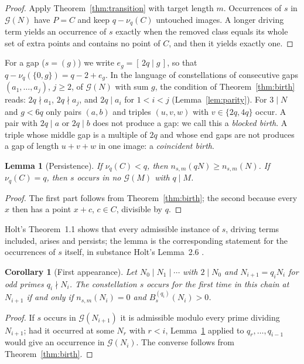 \documentclass[11pt]{article}
\newtheorem{lemma}[theorem]{Lemma}
\newtheorem{corollary}[theorem]{Corollary}
\theoremstyle{definition}
\theoremstyle{remark}
\newcommand{\G}{\mathcal{G}}
\begin{document}
\begin{proof}
Apply Theorem~\ref{thm:transition} with target length $m$. Occurrences of $s$ in $\G(N)$ have $P = C$ and keep $q - \nu_q(C)$ untouched images. A longer driving term yields an occurrence of $s$ exactly when the removed class equals its whole set of extra points and contains no point of $C$, and then it yields exactly one.
\end{proof}

For a gap ($s = (g)$) we write $e_g = [\,2q \mid g\,]$, so that $q - \nu_q(\{0, g\}) = q - 2 + e_g$. In the language of constellations of consecutive gaps $(a_1, \dots, a_j)$, $j \ge 2$, of $\G(N)$ with sum $g$, the condition of Theorem~\ref{thm:birth} reads: $2q \nmid a_1$, $2q \nmid a_j$, and $2q \mid a_i$ for $1 < i < j$ (Lemma~\ref{lem:parity}). For $3 \mid N$ and $g < 6q$ only pairs $(a, b)$ and triples $(u, v, w)$ with $v \in \{2q, 4q\}$ occur. A pair with $2q \mid a$ or $2q \mid b$ does not produce a gap: we call this a \emph{blocked birth}. A triple whose middle gap is a multiple of $2q$ and whose end gaps are not produces a gap of length $u + v + w$ in one image: a \emph{coincident birth}.

\begin{lemma}[Persistence]\label{lem:persistence}
If $\nu_q(C) < q$, then $n_{s,m}(qN) \ge n_{s,m}(N)$. If $\nu_q(C) = q$, then $s$ occurs in no $\G(M)$ with $q \mid M$.
\end{lemma}

\begin{proof}
The first part follows from Theorem~\ref{thm:birth}; the second because every $x$ then has a point $x + c$, $c \in C$, divisible by $q$.
\end{proof}

Holt's Theorem~1.1 \cite{Ho25} shows that every admissible instance of $s$, driving terms included, arises and persists; the lemma is the corresponding statement for the occurrences of $s$ itself, in substance Holt's Lemma~2.6 \cite{Ho26}.

\begin{corollary}[First appearance]\label{cor:first}
Let $N_0 \mid N_1 \mid \cdots$ with $2 \mid N_0$ and $N_{i+1} = q_i N_i$ for odd primes $q_i \nmid N_i$. The constellation $s$ occurs for the first time in this chain at $N_{i+1}$ if and only if $n_{s,m}(N_i) = 0$ and $B^{(q_i)}_s(N_i) > 0$.
\end{corollary}

\begin{proof}
If $s$ occurs in $\G(N_{i+1})$ it is admissible modulo every prime dividing $N_{i+1}$; had it occurred at some $N_r$ with $r < i$, Lemma~\ref{lem:persistence} applied to $q_r, \dots, q_{i-1}$ would give an occurrence in $\G(N_i)$. The converse follows from Theorem~\ref{thm:birth}.
\end{proof}
\end{document}

